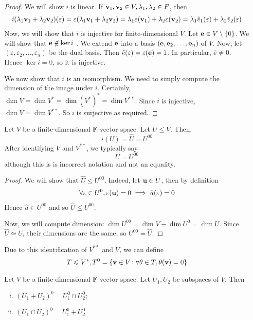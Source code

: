 \documentclass[a4paper]{article}
\begin{document}
\begin{proof}
	We will show \( i \) is linear.
	If \( {\bf v}_1, {\bf v}_2 \in V, \lambda_1, \lambda_2 \in F \), then
	\[
		i(\lambda_1 {\bf v}_1 + \lambda_2 {\bf v}_2) (\varepsilon) = \varepsilon(\lambda_1 {\bf v}_1 + \lambda_2 {\bf v}_2) = \lambda_1 \varepsilon({\bf v}_1) + \lambda_2 \varepsilon({\bf v}_2) = \lambda_1 \hat v_1(\varepsilon) + \lambda_2 \hat v_2(\varepsilon)
	\]
	Now, we will show that \( i \) is injective for finite-dimensional \( V \).
	Let \( {\bf e} \in V \setminus \qty{0} \).
	We will show that \( {\bf e} \not\in \ker i \)
    .
	We extend \( {\bf e} \) into a basis \( ({\bf e}, {\bf e}_2, \dots, {\bf e}_n) \) of \( V \).
	Now, let \( (\varepsilon, \varepsilon_2, \dots, \varepsilon_n) \) be the dual basis.
	Then \( \hat e(\varepsilon) = \varepsilon({\bf e}) = 1 \).
	In particular, \( \hat e \neq 0 \).
	Hence \( \ker i = \qty{0} \), so it is injective.

	We now show that \( i \) is an isomorphism.
	We need to simply compute the dimension of the image under \( i \).
	Certainly, \( \dim V = \dim V^* = \dim (V^*)^* = \dim V^{* *} \).
	Since \( i \) is injective, \( \dim V = \dim V^{* *} \).
	So \( i \) is surjective as required.
\end{proof}
\begin{lemma}
	Let \( V \) be a finite-dimensional \( {\mathbb{F}} \)-vector space.
	Let \( U \leq V \).
	Then,
	\[
		i(U)=\hat U = U^{00}
	\]
	After identifying \( V \) and \( V^{* *} \), we typically say
	\[
		U = U^{00}
	\]
	although this is is incorrect notation and not an equality.
\end{lemma}
\begin{proof}
	We will show that \( \hat U \leq U^{00} \).
	Indeed, let \( {\bf u} \in U \), then by definition
	\[
		\forall \varepsilon \in U^0, \varepsilon({\bf u}) = 0 \implies \hat u(\varepsilon) = 0
	\]
	Hence \( \hat u \in U^{00} \) and so \( \hat U \leq U^{00} \).

	Now, we will compute dimension:	\( \dim U^{00} = \dim V - \dim U^0 = \dim U \).
	Since \( \hat U \simeq U \), their dimensions are the same, so \( U^{00} = \hat U \).
\end{proof}
\begin{remark}
	Due to this identification of \( V^{* *} \) and \( V \), we can define
	\[
		T \leqslant V^*, T^0 = \qty{{\bf v}\in V \colon \forall \theta \in T, \theta({\bf v}) = 0}
	\]
\end{remark}
\begin{lemma}
	Let \( V \) be a finite-dimensional \( {\mathbb{F}} \)-vector space.
	Let \( U_1, U_2 \) be subspaces of \( V \).
	Then
	\begin{enumerate}[(i)]
		\item \( (U_1 + U_2)^0 = U_1^0 \cap U_2^0 \);
		\item \( (U_1 \cap U_2)^0 = U_1^0 + U_2^0 \)
	\end{enumerate}
\end{lemma}
\end{document}
